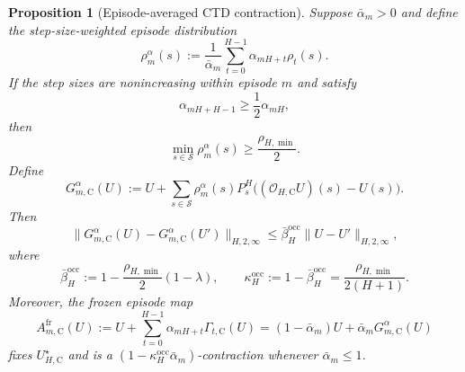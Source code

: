 \documentclass{article}
\newtheorem{proposition}[theorem]{Proposition}
\newcommand{\X}{\mathcal{S}}
\begin{document}
\begin{proposition}[Episode-averaged CTD contraction]
\label{prop:fh-ctd-avg-contract}
Suppose $\bar\alpha_m>0$ and define the step-size-weighted episode distribution
\begin{equation}
\rho_m^\alpha(s):=\frac{1}{\bar\alpha_m}\sum_{t=0}^{H-1}\alpha_{mH+t}\rho_t(s).
\end{equation}
If the step sizes are nonincreasing within episode $m$ and satisfy
\begin{equation}
\alpha_{mH+H-1}\ge\frac{1}{2}\alpha_{mH},
\label{eq:fh-step-regularity}
\end{equation}
then
\begin{equation}
\min_{s\in\X}\rho_m^\alpha(s)\ge\frac{\rho_{H,\min}}{2}.
\end{equation}
Define
\begin{equation}
G_{m,\mathrm C}^\alpha(U):=U+\sum_{s\in\X}\rho_m^\alpha(s)P_s^H\bigl((\mathcal O_{H,\mathrm C}U)(s)-U(s)\bigr).
\end{equation}
Then
\begin{equation}
\lVert G_{m,\mathrm C}^\alpha(U)-G_{m,\mathrm C}^\alpha(U')\rVert_{H,2,\infty}\le\bar\beta_{H}^{\mathrm{occ}}\lVert U-U'\rVert_{H,2,\infty},
\end{equation}
where
\begin{equation}
\bar\beta_{H}^{\mathrm{occ}}:=1-\frac{\rho_{H,\min}}{2}(1-\lambda),\qquad \kappa_H^{\mathrm{occ}}:=1-\bar\beta_H^{\mathrm{occ}}=\frac{\rho_{H,\min}}{2(H+1)}.
\end{equation}
Moreover, the frozen episode map
\begin{equation}
A_{m,\mathrm C}^{\mathrm{fr}}(U):=U+\sum_{t=0}^{H-1}\alpha_{mH+t}\Gamma_{t,\mathrm C}(U)=(1-\bar\alpha_m)U+\bar\alpha_mG_{m,\mathrm C}^\alpha(U)
\end{equation}
fixes $U_{H,\mathrm C}^\star$ and is a $(1-\kappa_H^{\mathrm{occ}}\bar\alpha_m)$-contraction whenever $\bar\alpha_m\le1$.
\end{proposition}
\end{document}
